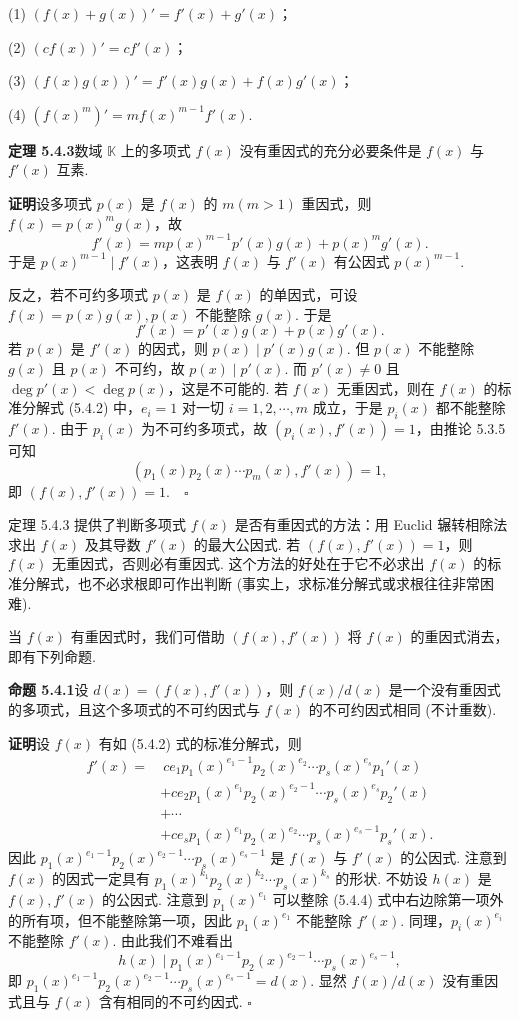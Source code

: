 \documentclass[UTF8,12pt,a4paper,fontset=fandol]{ctexart}
\begin{document}
(1) $(f(x)+g(x))'=f'(x)+g'(x)$；

(2) $(cf(x))'=cf'(x)$；

(3) $(f(x)g(x))'=f'(x)g(x)+f(x)g'(x)$；

(4) $(f(x)^m)'=mf(x)^{m-1}f'(x)$.

\noindent\textbf{定理 5.4.3}\quad 数域 $\mathbb{K}$ 上的多项式 $f(x)$ 没有重因式的充分必要条件是 $f(x)$ 与 $f'(x)$ 互素.

\noindent\textbf{证明}\quad 设多项式 $p(x)$ 是 $f(x)$ 的 $m(m>1)$ 重因式，则 $f(x)=p(x)^mg(x)$，故
\[
f'(x)=mp(x)^{m-1}p'(x)g(x)+p(x)^mg'(x).
\]
于是 $p(x)^{m-1}\mid f'(x)$，这表明 $f(x)$ 与 $f'(x)$ 有公因式 $p(x)^{m-1}$.

反之，若不可约多项式 $p(x)$ 是 $f(x)$ 的单因式，可设 $f(x)=p(x)g(x),p(x)$ 不能整除 $g(x)$. 于是
\[
f'(x)=p'(x)g(x)+p(x)g'(x).
\]
若 $p(x)$ 是 $f'(x)$ 的因式，则 $p(x)\mid p'(x)g(x)$. 但 $p(x)$ 不能整除 $g(x)$ 且 $p(x)$ 不可约，故 $p(x)\mid p'(x)$. 而 $p'(x)\neq 0$ 且 $\deg p'(x)<\deg p(x)$，这是不可能的. 若 $f(x)$ 无重因式，则在 $f(x)$ 的标准分解式 (5.4.2) 中，$e_i=1$ 对一切 $i=1,2,\cdots,m$ 成立，于是 $p_i(x)$ 都不能整除 $f'(x)$. 由于 $p_i(x)$ 为不可约多项式，故 $(p_i(x),f'(x))=1$，由推论 5.3.5 可知
\[
(p_1(x)p_2(x)\cdots p_m(x),f'(x))=1,
\]
即 $(f(x),f'(x))=1.\quad \square$

定理 5.4.3 提供了判断多项式 $f(x)$ 是否有重因式的方法：用 Euclid 辗转相除法求出 $f(x)$ 及其导数 $f'(x)$ 的最大公因式. 若 $(f(x),f'(x))=1$，则 $f(x)$ 无重因式，否则必有重因式. 这个方法的好处在于它不必求出 $f(x)$ 的标准分解式，也不必求根即可作出判断 (事实上，求标准分解式或求根往往非常困难).

当 $f(x)$ 有重因式时，我们可借助 $(f(x),f'(x))$ 将 $f(x)$ 的重因式消去，即有下列命题.

\noindent\textbf{命题 5.4.1}\quad 设 $d(x)=(f(x),f'(x))$，则 $f(x)/d(x)$ 是一个没有重因式的多项式，且这个多项式的不可约因式与 $f(x)$ 的不可约因式相同 (不计重数).

\noindent\textbf{证明}\quad 设 $f(x)$ 有如 (5.4.2) 式的标准分解式，则
\begin{equation}
\begin{aligned}
f'(x)=&\ ce_1p_1(x)^{e_1-1}p_2(x)^{e_2}\cdots p_s(x)^{e_s}p_1'(x)\\
&+ce_2p_1(x)^{e_1}p_2(x)^{e_2-1}\cdots p_s(x)^{e_s}p_2'(x)\\
&+\cdots\\
&+ce_sp_1(x)^{e_1}p_2(x)^{e_2}\cdots p_s(x)^{e_s-1}p_s'(x).
\end{aligned}
\tag{5.4.4}
\end{equation}
因此 $p_1(x)^{e_1-1}p_2(x)^{e_2-1}\cdots p_s(x)^{e_s-1}$ 是 $f(x)$ 与 $f'(x)$ 的公因式. 注意到 $f(x)$ 的因式一定具有 $p_1(x)^{k_1}p_2(x)^{k_2}\cdots p_s(x)^{k_s}$ 的形状. 不妨设 $h(x)$ 是 $f(x),f'(x)$ 的公因式. 注意到 $p_1(x)^{e_1}$ 可以整除 (5.4.4) 式中右边除第一项外的所有项，但不能整除第一项，因此 $p_1(x)^{e_1}$ 不能整除 $f'(x)$. 同理，$p_i(x)^{e_i}$ 不能整除 $f'(x)$. 由此我们不难看出
\[
h(x)\mid p_1(x)^{e_1-1}p_2(x)^{e_2-1}\cdots p_s(x)^{e_s-1},
\]
即 $p_1(x)^{e_1-1}p_2(x)^{e_2-1}\cdots p_s(x)^{e_s-1}=d(x)$. 显然 $f(x)/d(x)$ 没有重因式且与 $f(x)$ 含有相同的不可约因式. $\square$
\end{document}

